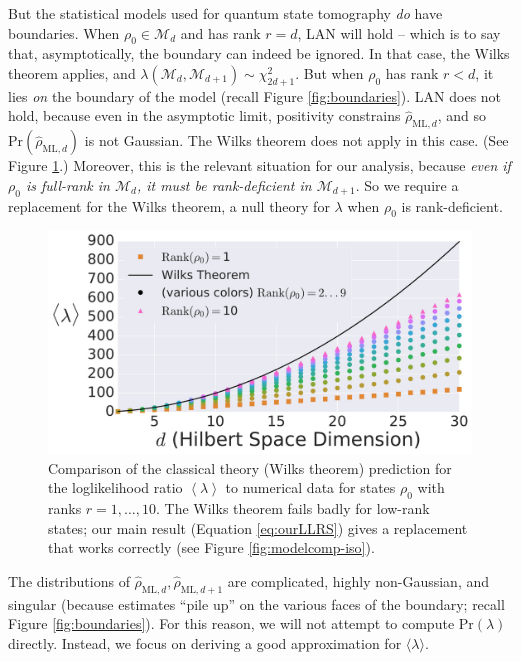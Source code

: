 \documentclass[aps,pra, twocolumn]{revtex4-1}
\newcommand{\M}{\mathcal{M}}
\newcommand{\expect}[1]{\ensuremath{\left\langle#1\right\rangle}}
\newcommand{\rhohat}{\hat{\rho}}
\newcommand{\rhoML}[1]{\rhohat_{\scriptscriptstyle{\mathrm{ML},#1}}}
\begin{document}
But the statistical models used for quantum state tomography \emph{do} have boundaries.  When $\rho_{0}\in \M_{d}$ and has rank $r = d$, LAN will hold -- which is to say that, asymptotically, the boundary can indeed be ignored.  In that case, the Wilks theorem applies, and $\lambda(\M_{d}, \M_{d + 1}) \sim \chi^{2}_{2d + 1}$.  But when $\rho_{0}$ has rank $r<d$, it lies \emph{on} the boundary of the model (recall Figure \ref{fig:boundaries}).  LAN does not hold, because even in the asymptotic limit, positivity constrains $\rhoML{d}$, and so $\mathrm{Pr}(\rhoML{d})$ is not Gaussian.  The Wilks theorem does not apply in this case.  (See Figure \ref{fig:boundaries2}.) Moreover, this is the relevant situation for our analysis, because \emph{even if $\rho_{0}$ is full-rank in $\M_{d}$, it must be rank-deficient in $\M_{d+1}$}.  So we require a replacement for the Wilks theorem, a null theory for $\lambda$ when $\rho_0$ is rank-deficient.

\begin{figure}
\includegraphics[width=\columnwidth]{Images/Figure_2A.pdf}
 \caption{Comparison of the classical theory (Wilks theorem) prediction for the loglikelihood ratio $\expect{\lambda}$ to numerical data for states $\rho_{0}$ with ranks $r=1,\ldots ,10$.  The Wilks theorem fails badly for low-rank states; our main result (Equation \ref{eq:ourLLRS}) gives a replacement that works correctly (see Figure \ref{fig:modelcomp-iso}).}
\label{fig:boundaries2}
\end{figure}

The distributions of $\rhoML{d}, \rhoML{d+1}$ are complicated, highly non-Gaussian, and singular (because estimates ``pile up'' on the various faces of the boundary; recall Figure \ref{fig:boundaries}).  For this reason, we will not attempt to compute $\mathrm{Pr}(\lambda)$ directly.  Instead, we focus on deriving a good approximation for $\langle \lambda \rangle$.
\end{document}
